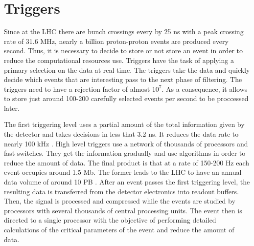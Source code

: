 \section{Triggers}

Since at the LHC there are bunch crossings every by 25 ns with a peak crossing rate of 31.6 MHz, nearly a billion proton-proton events are produced every second. Thus, it is necessary to decide
to store or not store an event in order to reduce the computational resources use. Triggers have the task of applying a primary selection on the data at real-time. The triggers take the data and quickly 
decide which events that are interesting pass to the next phase of filtering. The triggers need to have a rejection factor of almost $10^7$. As a consequence, it allows to store just around 100-200 
carefully selected events per second to be proccessed later. 

The first triggering level uses a partial amount of the total information given by the detector and takes decisions in less that 3.2 ns. 
It reduces the data rate to nearly 100 kHz \cite{LHC_collitions_web}. High level triggers use a network of thousands of processors and fast switches. They get the information gradually and use algorithms in order to reduce 
the amount of data. The final product is that at a rate of 150-200 Hz each event occupies around 1.5 Mb. The former leads to the LHC to have an annual data volume of around 10 PB \cite{Perspectives_LHC}. After an event 
passes the first triggering level, the resulting data is transferred from the detector electronics into readout buffers. Then, the signal is processed and compressed while the events are studied by 
processors with several thousands of central processing units. The event then is directed to a single processor with the objective of performing detailed calculations of the critical parameters of the 
event and reduce the amount of data.






